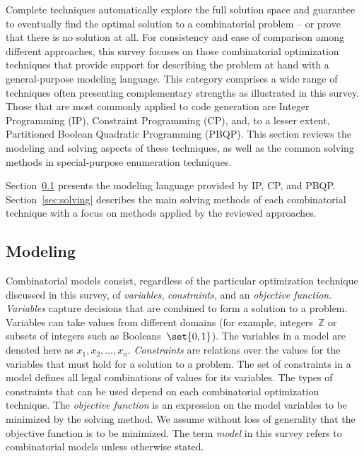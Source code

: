 \documentclass[acmsmall,authorversion,nonacm]{acmart}
\newcommand{\ZZ}{\ensuremath{\mathbb Z}}
\begin{document}
Complete techniques automatically explore the full solution space and
guarantee to eventually find the optimal solution to a combinatorial
problem -- or prove that there is no solution at all.
For consistency and ease of comparison among different approaches,
this survey focuses on those combinatorial optimization techniques
that provide support for describing the problem at hand with a
general-purpose modeling language.
This category comprises a wide range of techniques often presenting
complementary strengths as illustrated in this survey.
Those that are most commonly applied to code generation are Integer
Programming (IP), Constraint Programming (CP), and, to a lesser
extent, Partitioned Boolean Quadratic Programming (PBQP).
This section reviews the modeling and solving aspects of these
techniques, as well as the common solving methods in special-purpose
enumeration techniques.

Section~\ref{sec:modeling} presents the modeling language provided by
IP, CP, and PBQP.
Section~\ref{sec:solving} describes the main solving methods of each
combinatorial technique with a focus on methods applied by the
reviewed approaches.

\subsection{Modeling}\label{sec:modeling}

Combinatorial models consist, regardless of the particular
optimization technique discussed in this survey, of \emph{variables},
\emph{constraints}, and an \emph{objective function}.
\emph{Variables} capture decisions that are combined to form a
solution to a problem.
Variables can take values from different domains (for example,
integers~$\ZZ$ or subsets of integers such as Booleans~$\set{0,1}$).
The variables in a model are denoted here as $x_1, x_2, \ldots, x_n$.
\emph{Constraints} are relations over the values for the variables
that must hold for a solution to a problem.
The set of constraints in a model defines all legal combinations of
values for its variables.
The types of constraints that can be used depend on each combinatorial
optimization technique.
The \emph{objective function} is an expression on the model variables
to be minimized by the solving method.
We assume without loss of generality that the objective function is to
be minimized.
The term \emph{model} in this survey refers to combinatorial models
unless otherwise stated.

\newcommand{\technique}[4]{#1 & #2 & #3 & #4\\}
\newcommand{\techniqueNotes}[1]{& \multicolumn{3}{c}{(#1)}\\}
\end{document}
